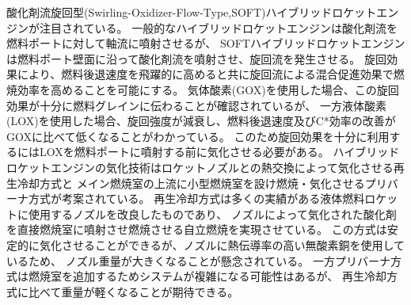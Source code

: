 酸化剤流旋回型(Swirling-Oxidizer-Flow-Type,SOFT)ハイブリッドロケットエンジンが注目されている。
一般的なハイブリッドロケットエンジンは酸化剤流を燃料ポートに対して軸流に噴射させるが、
SOFTハイブリッドロケットエンジンは燃料ポート壁面に沿って酸化剤流を噴射させ、旋回流を発生させる。
旋回効果により、燃料後退速度を飛躍的に高めると共に旋回流による混合促進効果で燃焼効率を高めることを可能にする。
気体酸素(GOX)を使用した場合、この旋回効果が十分に燃料グレインに伝わることが確認されているが、
一方液体酸素(LOX)を使用した場合、旋回強度が減衰し、燃料後退速度及びC*効率の改善がGOXに比べて低くなることがわかっている。
このため旋回効果を十分に利用するにはLOXを燃料ポートに噴射する前に気化させる必要がある。
ハイブリッドロケットエンジンの気化技術はロケットノズルとの熱交換によって気化させる再生冷却方式と
メイン燃焼室の上流に小型燃焼室を設け燃焼・気化させるプリバーナ方式が考案されている。
再生冷却方式は多くの実績がある液体燃料ロケットに使用するノズルを改良したものであり、
ノズルによって気化された酸化剤を直接燃焼室に噴射させ燃焼させる自立燃焼を実現させている。
この方式は安定的に気化させることができるが、ノズルに熱伝導率の高い無酸素銅を使用しているため、
ノズル重量が大きくなることが懸念されている。
一方プリバーナ方式は燃焼室を追加するためシステムが複雑になる可能性はあるが、
再生冷却方式に比べて重量が軽くなることが期待できる。
